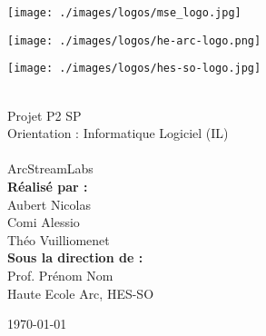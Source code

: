 \begin{titlepage}
\fontsize{5cm}{10}%
\selectfont

\begin{flushright}
\begin{minipage}{0.33\textwidth}
\begin{flushleft}
\texttt{[image: ./images/logos/mse\_logo.jpg]}
\end{flushleft}
\vspace{1.3cm}
\end{minipage}%
\begin{minipage}{0.33\textwidth}
\begin{center}
\texttt{[image: ./images/logos/he-arc-logo.png]}
\end{center}
\vspace{1.3cm}
\end{minipage}%
\begin{minipage}{0.33\textwidth}
\begin{flushright}
\texttt{[image: ./images/logos/hes-so-logo.jpg]}
\end{flushright}
\end{minipage}
\begin{flushleft}
\footnotesize
\vspace{-1cm}
\end{flushleft}
~\\[0.5cm]

\huge Projet P2 SP\\[0.5cm]

\large Orientation : Informatique Logiciel (IL)\\[0.5cm]
~\\[1cm]
{
\Huge ArcStreamLabs \\[1.5cm]
}
{
\textbf{Réalisé par :}\\
\huge Aubert Nicolas\\[0.5cm]
\huge Comi Alessio\\[0.5cm]
\huge Théo Vuilliomenet\\[0.5cm]
}
{
\textbf{Sous la direction de :} \\
Prof. Prénom Nom\\
Haute Ecole Arc, HES-SO\\[0.5cm]
}

\vfill

{\today}

\end{flushright}
\end{titlepage}
